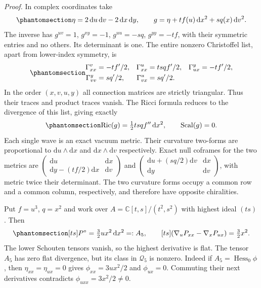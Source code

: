 \documentclass[
  english,
  11pt,
  reqno]{amsart}
\begin{document}
\emph{Proof.} In complex coordinates take
\begin{equation}\protect\phantomsection\label{eq:gg-two-wave-trial}{
 \eta=2\,\mathrm du\,\mathrm dv-2\,\mathrm dx\,\mathrm dy,\qquad
 g=\eta+t f(u)\,\mathrm dx^2+s q(x)\,\mathrm dv^2 .
}\end{equation} The inverse has \(g^{uv}=1\), \(g^{xy}=-1\),
\(g^{uu}=-sq\), \(g^{yy}=-tf\), with their symmetric entries and no
others. Its determinant is one. The entire nonzero Christoffel list,
apart from lower-index symmetry, is
\begin{equation}\protect\phantomsection\label{eq:gg-two-wave-christoffels}{
 \begin{aligned}
 \Gamma^v_{xx}&=-tf'/2,&
 \Gamma^u_{xx}&=tsqf'/2,&
 \Gamma^y_{ux}&=-tf'/2,\\
 \Gamma^y_{vv}&=sq'/2,&
 \Gamma^u_{vx}&=sq'/2.
 \end{aligned}
}\end{equation} In the order \((x,v,u,y)\) all connection matrices are
strictly triangular. Thus their traces and product traces vanish. The
Ricci formula reduces to the divergence of this list, giving exactly
\begin{equation}\protect\phantomsection\label{eq:gg-two-wave-ricci}{
 \operatorname{Ric}(g)=\tfrac12tsqf''\,\mathrm dx^2,
 \qquad \operatorname{Scal}(g)=0 .
}\end{equation} Each single wave is an exact vacuum metric. Their
curvature two-forms are proportional to \(\mathrm du\wedge\mathrm dx\)
and \(\mathrm dx\wedge\mathrm dv\) respectively. Exact null coframes for
the two metrics are
\(\left(\begin{smallmatrix}\mathrm du&\mathrm dx\\\mathrm dy-(tf/2)\mathrm dx&\mathrm dv\end{smallmatrix}\right)\)
and
\(\left(\begin{smallmatrix}\mathrm du+(sq/2)\mathrm dv&\mathrm dx\\\mathrm dy&\mathrm dv\end{smallmatrix}\right)\),
with metric twice their determinant. The two curvature forms occupy a
common row and a common column, respectively, and therefore have
opposite chiralities.

Put \(f=u^3\), \(q=x^2\) and work over \(A=\mathbb C[t,s]/(t^2,s^2)\)
with highest ideal \((ts)\). Then
\begin{equation}\protect\phantomsection\label{eq:gg-mixed-cotton}{
 [ts]P^\circ=\tfrac32ux^2\,\mathrm dx^2=:A_5,\qquad
 [ts](\nabla_uP_{xx}-\nabla_xP_{ux})=\tfrac32x^2 .
}\end{equation} The lower Schouten tensors vanish, so the highest
derivative is flat. The tensor \(A_5\) has zero flat divergence, but its
class in \(\mathcal Q_5\) is nonzero. Indeed if
\(A_5=\operatorname{Hess}_0\phi\), then \(\eta_{xx}=\eta_{ux}=0\) gives
\(\phi_{xx}=3ux^2/2\) and \(\phi_{ux}=0\). Commuting their next
derivatives contradicts \(\phi_{uxx}=3x^2/2\ne0\).
\end{document}
